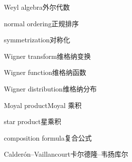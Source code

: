 \begin{multicols}{2}
Weyl algebra\hspace{0.9em}外尔代数\par
normal ordering\hspace{0.9em}正规排序\par
symmetrization\hspace{0.9em}对称化\par
Wigner transform\hspace{0.9em}维格纳变换\par
Wigner function\hspace{0.9em}维格纳函数\par
Wigner distribution\hspace{0.9em}维格纳分布\par
Moyal product\hspace{0.9em}Moyal 乘积\par
star product\hspace{0.9em}星乘积\par
composition formula\hspace{0.9em}复合公式\par
Calderón–Vaillancourt\hspace{0.9em}卡尔德隆–韦扬库尔\par
\end{multicols}

